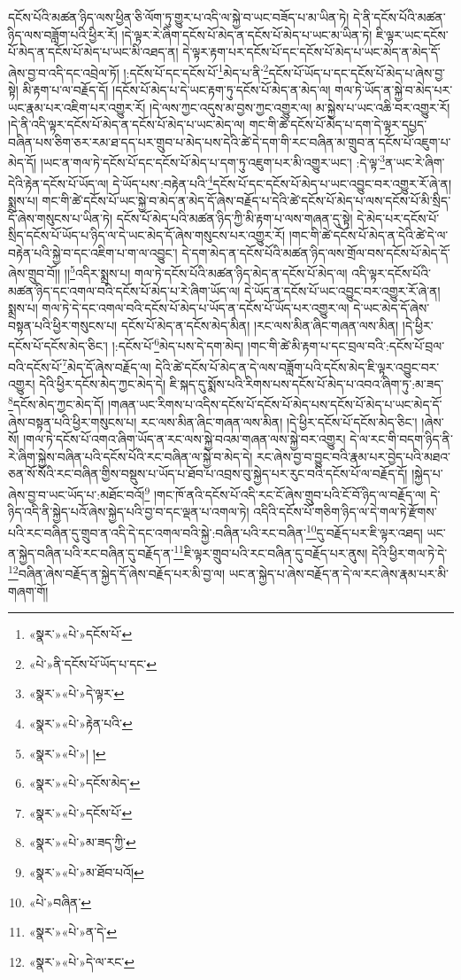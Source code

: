 དངོས་པོའི་མཚན་ཉིད་ལས་ཕྱིན་ཅི་ལོག་ཏུ་གྱུར་པ་འདི་ལ་སྐྱེ་བ་ཡང་བཟོད་པ་མ་ཡིན་ཏེ། དེ་ནི་དངོས་པོའི་མཚན་ཉིད་ལས་བཟློག་པའི་ཕྱིར་རོ། །དེ་ལྟར་རེ་ཞིག་དངོས་པོ་མེད་ན་དངོས་པོ་མེད་པ་ཡང་མ་ཡིན་ཏེ། ཇི་ལྟར་ཡང་དངོས་པོ་མེད་ན་དངོས་པོ་མེད་པ་ཡང་མི་འཐད་ན། དེ་ལྟར་རྟག་པར་དངོས་པོ་དང་དངོས་པོ་མེད་པ་ཡང་མེད་ན་མེད་དོ་ཞེས་བྱ་བ་འདི་དང་འབྲེལ་ཏོ། །:དངོས་པོ་དང་དངོས་པོ་\footnote{«སྣར་»«པེ་»དངོས་པོ་}མེད་པ་ནི་\footnote{«པེ་»ནི་དངོས་པོ་ཡོད་པ་དང་}དངོས་པོ་ཡོད་པ་དང་དངོས་པོ་མེད་པ་ཞེས་བྱ་སྟེ། མི་རྟག་པ་ལ་བརྗོད་དོ། །དངོས་པོ་མེད་པ་དེ་ཡང་རྟག་ཏུ་དངོས་པོ་མེད་ན་མེད་ལ། གལ་ཏེ་ཡོད་ན་སྐྱེ་བ་མེད་པར་ཡང་རྣམ་པར་འཇིག་པར་འགྱུར་རོ། །དེ་ལས་ཀྱང་འདུས་མ་བྱས་ཀྱང་འགྱུར་ལ། མ་སྐྱེས་པ་ཡང་འཆི་བར་འགྱུར་རོ། །དེ་ནི་འདི་ལྟར་དངོས་པོ་མེད་ན་དངོས་པོ་མེད་པ་ཡང་མེད་ལ། གང་གི་ཚེ་དངོས་པོ་མེད་པ་དག་དེ་ལྟར་དཔྱད་བཞིན་པས་ཅིག་ཅར་རམ་ཐ་དད་པར་གྲུབ་པ་མེད་པས་དེའི་ཚེ་དེ་དག་གི་རང་བཞིན་མ་གྲུབ་ན་དངོས་པོ་འཇུག་པ་མེད་དོ། །ཡང་ན་གལ་ཏེ་དངོས་པོ་དང་དངོས་པོ་མེད་པ་དག་ཏུ་འཇུག་པར་མི་འགྱུར་ཡང་། :དེ་ལྟ་\footnote{«སྣར་»«པེ་»དེ་ལྟར་}ན་ཡང་རེ་ཞིག་དེའི་རྟེན་དངོས་པོ་ཡོད་ལ། དེ་ཡོད་པས་:བརྟེན་པའི་\footnote{«སྣར་»«པེ་»རྟེན་པའི་}དངོས་པོ་དང་དངོས་པོ་མེད་པ་ཡང་འབྱུང་བར་འགྱུར་རོ་ཞེ་ན། སྨྲས་པ། གང་གི་ཚེ་དངོས་པོ་ཡང་སྐྱེ་བ་མེད་ན་མེད་དོ་ཞེས་བརྗོད་པ་དེའི་ཚེ་དངོས་པོ་མེད་པ་ལས་དངོས་པོ་མི་སྲིད་དོ་ཞེས་གསུངས་པ་ཡིན་ཏེ། དངོས་པོ་མེད་པའི་མཚན་ཉིད་ཀྱི་མི་རྟག་པ་ལས་གཞན་དུ་སྟེ། དེ་མེད་པར་དངོས་པོ་སྲིད་དངོས་པོ་ཡོད་པ་ཉིད་ལ་དེ་ཡང་མེད་དོ་ཞེས་གསུངས་པར་འགྱུར་རོ། །གང་གི་ཚེ་དངོས་པོ་མེད་ན་དེའི་ཚེ་དེ་ལ་བརྟེན་པའི་སྐྱེ་བ་དང་འཇིག་པ་ག་ལ་འབྱུང་། དེ་དག་མེད་ན་དངོས་པོའི་མཚན་ཉིད་ལས་གྲོལ་བས་དངོས་པོ་མེད་དོ་ཞེས་གྲུབ་བོ།། །།\footnote{«སྣར་»«པེ་»། །}འདིར་སྨྲས་པ། གལ་ཏེ་དངོས་པོའི་མཚན་ཉིད་མེད་ན་དངོས་པོ་མེད་ལ། འདི་ལྟར་དངོས་པོའི་མཚན་ཉིད་དང་འགལ་བའི་དངོས་པོ་མེད་པ་རེ་ཞིག་ཡོད་ལ། དེ་ཡོད་ན་དངོས་པོ་ཡང་འབྱུང་བར་འགྱུར་རོ་ཞེ་ན། སྨྲས་པ། གལ་ཏེ་དེ་དང་འགལ་བའི་དངོས་པོ་མེད་པ་ཡོད་ན་དངོས་པོ་ཡོད་པར་འགྱུར་ལ། དེ་ཡང་མེད་དོ་ཞེས་བསྟན་པའི་ཕྱིར་གསུངས་པ། དངོས་པོ་མེད་ན་དངོས་མེད་མིན། །རང་ལས་མིན་ཞིང་གཞན་ལས་མིན། །དེ་ཕྱིར་དངོས་པོ་དངོས་མེད་ཅིང་། །:དངོས་པོ་\footnote{«སྣར་»«པེ་»དངོས་མེད་}མེད་པས་དེ་དག་མེད། །གང་གི་ཚེ་མི་རྟག་པ་དང་བྲལ་བའི་:དངོས་པོ་བྲལ་བའི་དངོས་པོ་\footnote{«སྣར་»«པེ་»དངོས་པོ་}མེད་དོ་ཞེས་བརྗོད་ལ། དེའི་ཚེ་དངོས་པོ་མེད་ན་དེ་ལས་བཟློག་པའི་དངོས་མེད་ཇི་ལྟར་འབྱུང་བར་འགྱུར། དེའི་ཕྱིར་དངོས་མེད་ཀྱང་མེད་དེ། ཇི་སྐད་དུ་སྨོས་པའི་རིགས་པས་དངོས་པོ་མེད་པ་འབའ་ཞིག་ཏུ་:མ་ཟད་\footnote{«སྣར་»«པེ་»མ་ཟད་ཀྱི་}དངོས་མེད་ཀྱང་མེད་དོ། །གཞན་ཡང་རིགས་པ་འདིས་དངོས་པོ་དངོས་པོ་མེད་པས་དངོས་པོ་མེད་པ་ཡང་མེད་དོ་ཞེས་བསྟན་པའི་ཕྱིར་གསུངས་པ། རང་ལས་མིན་ཞིང་གཞན་ལས་མིན། །དེ་ཕྱིར་དངོས་པོ་དངོས་མེད་ཅིང་། །ཞེས་སོ། །གལ་ཏེ་དངོས་པོ་འགའ་ཞིག་ཡོད་ན་རང་ལས་སྐྱེ་བའམ་གཞན་ལས་སྐྱེ་བར་འགྱུར། དེ་ལ་རང་གི་བདག་ཉིད་ནི་རེ་ཞིག་སྐྱེས་བཞིན་པའི་དངོས་པོའི་རང་བཞིན་ལ་སྐྱེ་བ་མེད་དེ། རང་ཞེས་བྱ་བ་བྱུང་བའི་རྣམ་པར་བྱེད་པའི་མཐའ་ཅན་སོ་སོའི་རང་བཞིན་གྱིས་བསྡུས་པ་ཡོད་པ་ཐོབ་པ་འབྲས་བུ་སྐྱེད་པར་རུང་བའི་དངོས་པོ་ལ་བརྗོད་དོ། །སྐྱེད་པ་ཞེས་བྱ་བ་ཡང་ཡོད་པ་:མཐོང་བའོ།\footnote{«སྣར་»«པེ་»མ་ཐོབ་པའོ།} །གང་ཁོ་ནའི་དངོས་པོ་འདི་རང་ངོ་ཞེས་གྲུབ་པའི་ངོ་བོ་ཉིད་ལ་བརྗོད་ལ། དེ་ཉིད་འདི་ནི་སྐྱེད་པའོ་ཞེས་སྐྱེད་པའི་བྱ་བ་དང་ལྡན་པ་འགལ་ཏེ། འདིའི་དངོས་པོ་གཅིག་ཉིད་ལ་དེ་གལ་ཏེ་རྫོགས་པའི་རང་བཞིན་དུ་གྲུབ་ན་འདི་དེ་དང་འགལ་བའི་སྐྱེ་:བཞིན་པའི་རང་བཞིན་\footnote{«པེ་»བཞིན་}དུ་བརྗོད་པར་ཇི་ལྟར་འཐད། ཡང་ན་སྐྱེད་བཞིན་པའི་རང་བཞིན་དུ་བརྗོད་ན་\footnote{«སྣར་»«པེ་»ན་དེ་}ཇི་ལྟར་གྲུབ་པའི་རང་བཞིན་དུ་བརྗོད་པར་ནུས། དེའི་ཕྱིར་གལ་ཏེ་དེ་\footnote{«སྣར་»«པེ་»དེ་ལ་རང་}བཞིན་ཞེས་བརྗོད་ན་སྐྱེད་དོ་ཞེས་བརྗོད་པར་མི་བྱ་ལ། ཡང་ན་སྐྱེད་པ་ཞེས་བརྗོད་ན་དེ་ལ་རང་ཞེས་རྣམ་པར་མི་གཞག་གོ། 